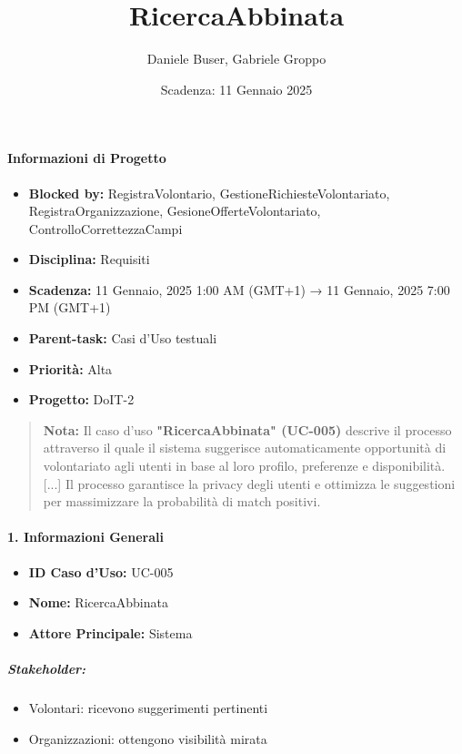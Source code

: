 \title{RicercaAbbinata}
\author{Daniele Buser, Gabriele Groppo}
\date{Scadenza: 11 Gennaio 2025}

\maketitle

\paragraph*{Informazioni di Progetto}
\begin{itemize}
    \item \textbf{Blocked by:} RegistraVolontario, GestioneRichiesteVolontariato, RegistraOrganizzazione, GesioneOfferteVolontariato, ControlloCorrettezzaCampi
    \item \textbf{Disciplina:} Requisiti
    \item \textbf{Scadenza:}  11 Gennaio, 2025 1:00 AM (GMT+1) → 11 Gennaio, 2025 7:00 PM (GMT+1)
    \item \textbf{Parent-task:} Casi d'Uso testuali
    \item \textbf{Priorità:} Alta
    \item \textbf{Progetto:} DoIT-2
\end{itemize}

\begin{quote}
\textbf{Nota:} Il caso d'uso \textbf{"RicercaAbbinata" (UC-005)} descrive il processo attraverso il quale il sistema suggerisce automaticamente opportunità di volontariato agli utenti in base al loro profilo, preferenze e disponibilità. [...] Il processo garantisce la privacy degli utenti e ottimizza le suggestioni per massimizzare la probabilità di match positivi.
\end{quote}

\paragraph{1. Informazioni Generali}
\begin{itemize}
    \item \textbf{ID Caso d'Uso:} UC-005
    \item \textbf{Nome:} RicercaAbbinata
    \item \textbf{Attore Principale:} Sistema
\end{itemize}

\subparagraph*{Stakeholder:}
\begin{itemize}
    \item Volontari: ricevono suggerimenti pertinenti
    \item Organizzazioni: ottengono visibilità mirata
\end{itemize}

